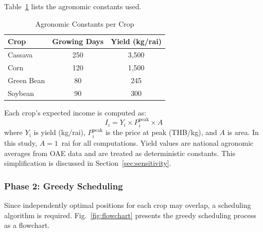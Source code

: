 \documentclass[conference]{IEEEtran}
\begin{document}
Table~\ref{tab:agro} lists the agronomic constants used.

\begin{table}[htbp]
  \centering
  \caption{Agronomic Constants per Crop}
  \label{tab:agro}
  \begin{tabular}{lcc}
    \toprule
    \textbf{Crop} & \textbf{Growing Days} & \textbf{Yield (kg/rai)} \\
    \midrule
    Cassava & 250 & 3,500 \\
    Corn & 120 & 1,500 \\
    Green Bean & 80 & 245 \\
    Soybean & 90 & 300 \\
    \bottomrule
  \end{tabular}
\end{table}

Each crop's expected income is computed as:
\begin{equation}
  I_i = Y_i \times P_i^{\text{peak}} \times A
\end{equation}
where $Y_i$ is yield (kg/rai), $P_i^{\text{peak}}$ is the price at peak (THB/kg), and $A$ is area. In this study, $A = 1$~rai for all computations. Yield values are national agronomic averages from OAE data and are treated as deterministic constants. This simplification is discussed in Section~\ref{sec:sensitivity}.

\subsubsection{Phase 2: Greedy Scheduling}

Since independently optimal positions for each crop may overlap, a scheduling algorithm is required. Fig.~\ref{fig:flowchart} presents the greedy scheduling process as a flowchart.
\end{document}
